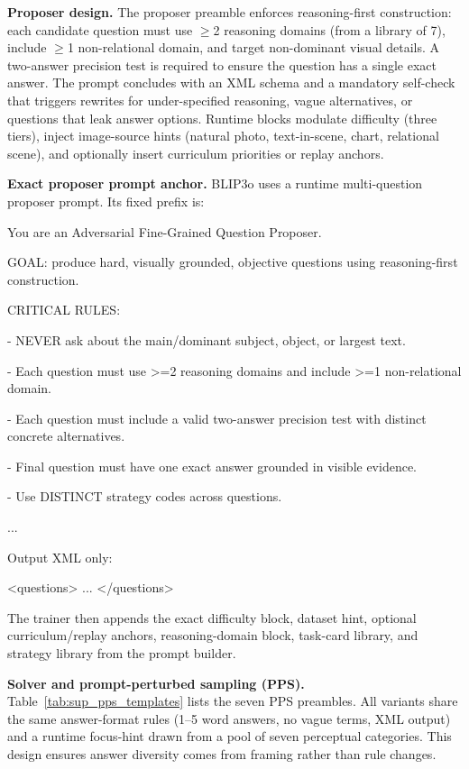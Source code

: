\documentclass[runningheads]{llncs}
\begin{document}
\noindent\textbf{Proposer design.}
The proposer preamble enforces reasoning-first construction: each candidate question must use $\geq$2 reasoning domains (from a library of 7), include $\geq$1 non-relational domain, and target non-dominant visual details. A two-answer precision test is required to ensure the question has a single exact answer. The prompt concludes with an XML schema and a mandatory self-check that triggers rewrites for under-specified reasoning, vague alternatives, or questions that leak answer options. Runtime blocks modulate difficulty (three tiers), inject image-source hints (natural photo, text-in-scene, chart, relational scene), and optionally insert curriculum priorities or replay anchors.

\noindent\textbf{Exact proposer prompt anchor.}
BLIP3o uses a runtime multi-question proposer prompt. Its fixed prefix is:
\begin{promptbox}
\small
\ttfamily\raggedright
You are an Adversarial Fine-Grained Question Proposer.\par
GOAL: produce hard, visually grounded, objective questions using reasoning-first construction.\par
CRITICAL RULES:\par
- NEVER ask about the main/dominant subject, object, or largest text.\par
- Each question must use >=2 reasoning domains and include >=1 non-relational domain.\par
- Each question must include a valid two-answer precision test with distinct concrete alternatives.\par
- Final question must have one exact answer grounded in visible evidence.\par
- Use DISTINCT strategy codes across questions.\par
...\par
Output XML only:\par
<questions> ... </questions>
\end{promptbox}
The trainer then appends the exact difficulty block, dataset hint, optional curriculum/replay anchors, reasoning-domain block, task-card library, and strategy library from the prompt builder.

\noindent\textbf{Solver and prompt-perturbed sampling (PPS).}
Table~\ref{tab:sup_pps_templates} lists the seven PPS preambles. All variants share the same answer-format rules (1--5 word answers, no vague terms, XML output) and a runtime focus-hint drawn from a pool of seven perceptual categories. This design ensures answer diversity comes from framing rather than rule changes.
\end{document}
